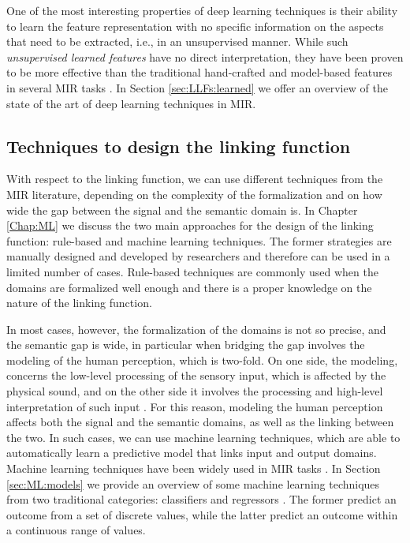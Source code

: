 One of the most interesting properties of deep learning techniques is their ability to learn the feature representation with no specific information on the aspects that need to be extracted, i.e., in an unsupervised manner. While such \textit{unsupervised learned features} have no direct interpretation, they have been proven to be more effective than the traditional hand-crafted and model-based features in several MIR tasks \cite{Hamel2010, Schmidt2011, Humphrey2013}. In Section \ref{sec:LLFs:learned} we offer an overview of the state of the art of deep learning techniques in MIR.

\subsection{Techniques to design the linking function}

With respect to the linking function, we can use different techniques from the MIR literature, depending on the complexity of the formalization and on how wide the gap between the signal and the semantic domain is. In Chapter \ref{Chap:ML} we discuss the two main approaches for the design of the linking function: rule-based and machine learning techniques. The former strategies are manually designed and developed by researchers and therefore can be used in a limited number of cases. Rule-based techniques are commonly used when the domains are formalized well enough and there is a proper knowledge on the nature of the linking function. 

In most cases, however, the formalization of the domains is not so precise, and the semantic gap is wide, in particular when bridging the gap involves the modeling of the human perception, which is two-fold. On one side, the modeling, concerns the low-level processing of the sensory input, which is affected by the physical sound, and on the other side it involves the processing and high-level interpretation of such input \cite{Bernstein2010}. For this reason, modeling the human perception affects both the signal and the semantic domains, as well as the linking between the two. In such cases, we can use machine learning techniques, which are able to automatically learn a predictive model that links input and output domains. Machine learning techniques have been widely used in MIR tasks \cite{coviello2011,sturm2014}. In Section \ref{sec:ML:models} we provide an overview of some machine learning techniques from two traditional categories: classifiers and regressors \cite{friedman2001}. The former predict an outcome from a set of discrete values, while the latter predict an outcome within a continuous range of values. 


